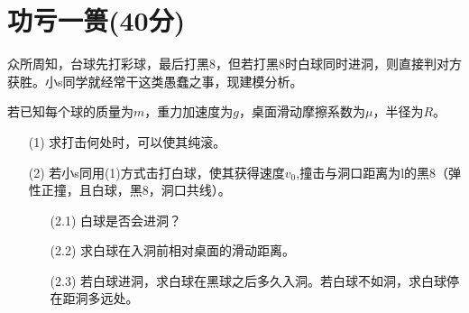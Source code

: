 \documentclass{article}
\begin{document}
\section*{功亏一篑(40分)}
众所周知，台球先打彩球，最后打黑8，但若打黑8时白球同时进洞，则直接判对方获胜。小s同学就经常干这类愚蠢之事，现建模分析。\par
若已知每个球的质量为$m$，重力加速度为$g$，桌面滑动摩擦系数为$\mu$，半径为$R$。
\begin{itemize}
\item[(1)]求打击何处时，可以使其纯滚。
\item[(2)]若小s同用(1)方式击打白球，使其获得速度$v_0$,撞击与洞口距离为l的黑8（弹性正撞，且白球，黑8，洞口共线）。
\begin{itemize}
\item[(2.1)]白球是否会进洞？
\item[(2.2)]求白球在入洞前相对桌面的滑动距离。
\item[(2.3)]若白球进洞，求白球在黑球之后多久入洞。若白球不如洞，求白球停在距洞多远处。
\end{itemize}
\end{itemize}
\end{document}
